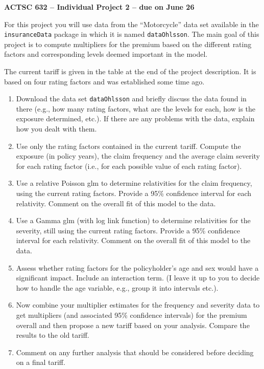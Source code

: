 \documentclass[11pt]{article}
\begin{document}
\begin{center}
{\large \bf ACTSC 632 -- Individual Project 2 -- due on June 26} \\

\end{center}



For this project you will use data from the ``Motorcycle'' data set available in the {\tt insuranceData} package in which it is named {\tt dataOhlsson}.  The main goal of this project is to compute multipliers for the premium based on the different rating factors and corresponding levels deemed important in the model.

The current tariff  is given in the table at the end of the project description. It is based on four rating factors and was established some time ago.


\begin{enumerate}
  
\item Download the data set {\tt dataOhlsson} and briefly discuss the data found in there (e.g., how many rating factors, what are the levels for each, how is the exposure determined, etc.). If there are any problems with the data, explain how you dealt with them.
\item Use only the rating factors contained in the current tariff. Compute the exposure (in policy years), the claim frequency and the average claim severity for each rating factor (i.e., for each possible value of each rating factor).
\item Use a relative Poisson glm to determine relativities for the claim frequency, using the current rating factors.
Provide a 95\% confidence interval for each relativity. Comment on the overall fit of this model to the data.
\item Use a Gamma glm (with log link function) to determine relativities for the severity, still using the current rating factors.
Provide a 95\% confidence interval for each relativity. Comment on the overall fit of this model to the data.
\item Assess whether rating factors for the policyholder's age and sex would have a significant impact. Include an interaction term. (I leave it up to you to decide how to handle the age variable, e.g., group it into intervals etc.).
\item Now combine your multiplier estimates for the frequency and severity data to get multipliers (and associated 95\% confidence intervals) for the premium overall and then propose a new tariff based on your analysis. Compare the results to the old tariff.
  \item Comment on any further analysis that should be considered before deciding on a final tariff. 
\end{enumerate}
\end{document}
